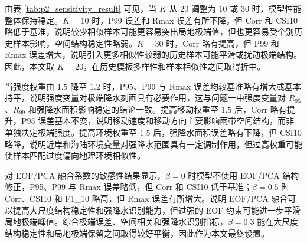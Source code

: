 \documentclass[UTF8,a4paper,zihao=5]{ctexart}
\numberwithin{equation}{section}
\numberwithin{figure}{section}
\numberwithin{table}{section}
\begin{document}
\begin{table}[H]
\centering
\caption{关键参数敏感性分析结果}
\label{tab:p2_sensitivity_result}
\end{table}

由表 \ref{tab:p2_sensitivity_result} 可见，当 $K$ 从 $20$ 调整为 $10$ 或 $30$ 时，模型性能整体保持稳定。$K=10$ 时，P99 误差和 Rmax 误差有所下降，但 Corr 和 CSI10 略低于基准，说明较少相似样本可能更容易突出局地极端值，但也更容易受个别历史样本影响，空间结构稳定性略弱。$K=30$ 时，Corr 略有提高，但 P99 和 Rmax 误差增大，说明引入更多相似性较弱的历史样本可能平滑或扰动极端结构。因此，本文取 $K=20$，在历史模板多样性和样本相似性之间取得折中。

当强度权重由 $1.5$ 降至 $1.2$ 时，P95、P99 与 Rmax 误差均较基准略有增大或基本持平，说明强度变量对极端降水刻画具有必要作用，这与问题一中强度变量对 $R_{95}$、$R_{99}$ 和强降水面积影响稳定的结论一致。提高移动权重至 $1.5$ 后，Corr 略有提升，P95 误差基本不变，说明移动速度和移动方向主要影响雨带空间结构，而非单独决定极端强度。提高环境权重至 $1.5$ 后，强降水面积误差略有下降，但 CSI10 略降，说明近岸和海陆环境变量对强降水范围具有一定调制作用，但过高权重可能使样本匹配过度偏向地理环境相似性。

对 EOF/PCA 融合系数的敏感性结果显示，$\beta=0$ 时模型不使用 EOF/PCA 结构修正，P95、P99 与 Rmax 误差略低，但 Corr 和 CSI10 低于基准；$\beta=0.5$ 时 Corr、CSI10 和 F1\_10 略高，但 Rmax 误差有所增大。说明 EOF/PCA 融合可以提高大尺度结构稳定性和强降水识别能力，但过强的 EOF 约束可能进一步平滑局地极端峰值。综合极端误差、空间相关和强降水识别指标，$\beta=0.3$ 能在大尺度结构稳定性和局地极端保留之间取得较好平衡，因此作为本文最终设置。
\end{document}

